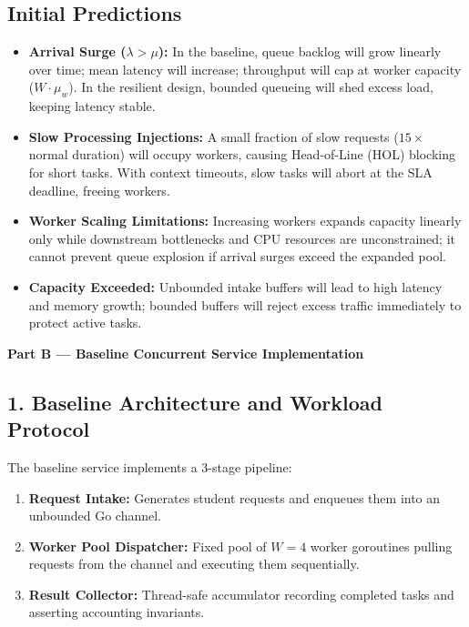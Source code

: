 \documentclass[11pt]{article}
\begin{document}
\subsection*{Initial Predictions}
\begin{itemize}[itemsep=0.15em]
    \item \textbf{Arrival Surge ($\lambda > \mu$):} In the baseline, queue backlog will grow linearly over time; mean latency will increase; throughput will cap at worker capacity ($W \cdot \mu_w$). In the resilient design, bounded queueing will shed excess load, keeping latency stable.
    \item \textbf{Slow Processing Injections:} A small fraction of slow requests ($15\times$ normal duration) will occupy workers, causing Head-of-Line (HOL) blocking for short tasks. With context timeouts, slow tasks will abort at the SLA deadline, freeing workers.
    \item \textbf{Worker Scaling Limitations:} Increasing workers expands capacity linearly only while downstream bottlenecks and CPU resources are unconstrained; it cannot prevent queue explosion if arrival surges exceed the expanded pool.
    \item \textbf{Capacity Exceeded:} Unbounded intake buffers will lead to high latency and memory growth; bounded buffers will reject excess traffic immediately to protect active tasks.
\end{itemize}



\newpage
{\centering\fontsize{14}{17}\selectfont\textbf{Part B --- Baseline Concurrent Service Implementation}\par}
\vspace{0.6em}

\subsection*{1. Baseline Architecture and Workload Protocol}
The baseline service implements a 3-stage pipeline:
\begin{enumerate}[itemsep=0.15em]
    \item \textbf{Request Intake:} Generates student requests and enqueues them into an unbounded Go channel.
    \item \textbf{Worker Pool Dispatcher:} Fixed pool of $W = 4$ worker goroutines pulling requests from the channel and executing them sequentially.
    \item \textbf{Result Collector:} Thread-safe accumulator recording completed tasks and asserting accounting invariants.
\end{enumerate}
\end{document}
